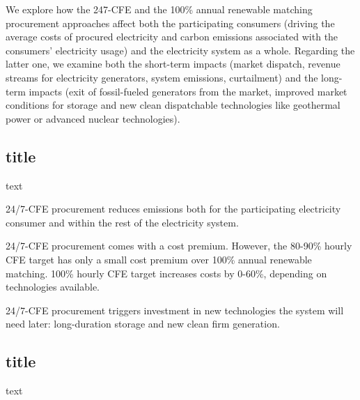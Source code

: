 We explore how the 247-CFE and the 100\% annual renewable matching procurement approaches affect both the participating consumers (driving the average costs of procured electricity and carbon emissions associated with the consumers' electricity usage) and the electricity system as a whole. 
Regarding the latter one, we examine both the short-term impacts (market dispatch, revenue streams for electricity generators, system emissions, curtailment) and the long-term impacts (exit of fossil-fueled generators from the market, improved market conditions for storage and new clean dispatchable technologies like geothermal power or advanced nuclear technologies).

\subsection{title}

text 

\vspace*{5pt}
\begin{res}
    24/7-CFE procurement reduces emissions both for the participating electricity consumer and within the rest of the electricity system.
\end{res}

\vspace*{5pt}
\begin{res}
    24/7-CFE procurement comes with a cost premium. However, the 80-90\% hourly CFE target has only a small cost premium over 100\% annual renewable matching. 100\% hourly CFE target increases costs by 0-60\%, depending on technologies available.
\end{res}

\vspace*{5pt}
\begin{res}
    24/7-CFE procurement triggers investment in new technologies the system will need later: long-duration storage and new clean firm generation.
\end{res}


\subsection{title}

text
